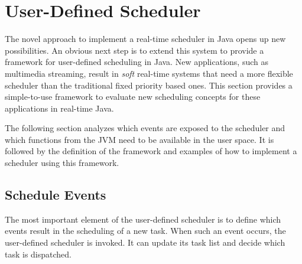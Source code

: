 \section{User-Defined Scheduler}
\label{sec:usersched}

The novel approach to implement a real-time scheduler in Java opens
up new possibilities. An obvious next step is to extend this system
to provide a framework for user-defined scheduling in Java. New
applications, such as multimedia streaming, result in \emph{soft}
real-time systems that need a more flexible scheduler than the
traditional fixed priority based ones. This section provides a
simple-to-use framework to evaluate new scheduling concepts for
these applications in real-time Java.

The following section analyzes which events are exposed to the
scheduler and which functions from the JVM need to be available in
the user space. It is followed by the definition of the framework
and examples of how to implement a scheduler using this framework.

\subsection{Schedule Events}

The most important element of the user-defined scheduler is to
define which events result in the scheduling of a new task. When
such an event occurs, the user-defined scheduler is invoked. It can
update its task list and decide which task is dispatched.

